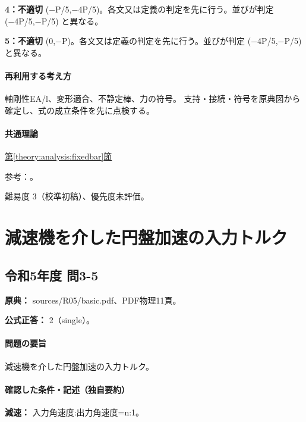 \noindent\textbf{4：不適切} (−P/5,−4P/5)。各文又は定義の判定を先に行う。並びが判定 (−4P/5,−P/5) と異なる。\par

\noindent\textbf{5：不適切} (0,−P)。各文又は定義の判定を先に行う。並びが判定 (−4P/5,−P/5) と異なる。\par

\paragraph{再利用する考え方} 軸剛性EA/l、変形適合、不静定棒、力の符号。 支持・接続・符号を原典図から確定し、式の成立条件を先に点検する。

\paragraph{共通理論} \hyperref[theory:analysis:fixedbar]{第\ref*{theory:analysis:fixedbar}節}

\par 参考：\cite{mit_material_elastic2000}。

\par 難易度 3（校準初稿）、優先度未評価。

\section{減速機を介した円盤加速の入力トルク}

\subsection{令和5年度 問3-5}
\label{q:r05-reg-basic-3-5}

\noindent\textbf{原典：} sources/R05/basic.pdf、PDF物理11頁。

\textbf{公式正答：} 2（single）。

\paragraph{問題の要旨} 減速機を介した円盤加速の入力トルク。

\paragraph{確認した条件・記述（独自要約）}\mbox{}\par

\noindent\textbf{減速：} 入力角速度:出力角速度=n:1。\par

